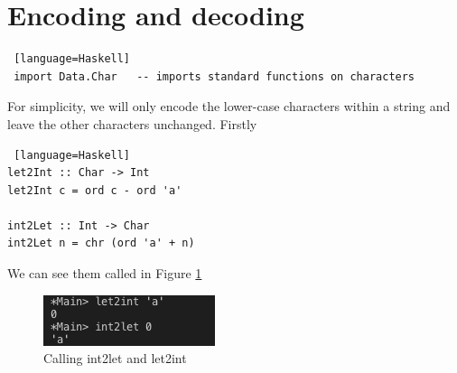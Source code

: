 \documentclass{beamer}
\def\frametitle#1{}
\begin{document}
\pagebreak
\section{Encoding and decoding}
 \begin{frame}[fragile, label=encoding]
  \frametitle{Encoding and Decoding} 
   \begin{onlyenv}
  \begin{lstlisting} [language=Haskell]
 import Data.Char   -- imports standard functions on characters
  \end{lstlisting}
  \end{onlyenv}

    \pause
For simplicity, we will only encode the lower-case characters within a string and leave the other characters unchanged. 
Firstly 
  \begin{onlyenv}
  \begin{lstlisting} [language=Haskell]
let2Int :: Char -> Int
let2Int c = ord c - ord 'a' 

int2Let :: Int -> Char
int2Let n = chr (ord 'a' + n)
 \end{lstlisting}
  \end{onlyenv}
\end{frame}

\begin{frame}[fragile, label=encoding2]
 \frametitle{Encoding and Decoding contd. } 
We can see them  called in Figure \ref{int2let}
 \begin{figure} [H]

			\centering
			\includegraphics[page=1,width=.5\textwidth]{img/01.png}
				   \caption{ Calling int2let and let2int}
		   \label {int2let}
		   \end{figure}

\end{frame}
\end{document}
